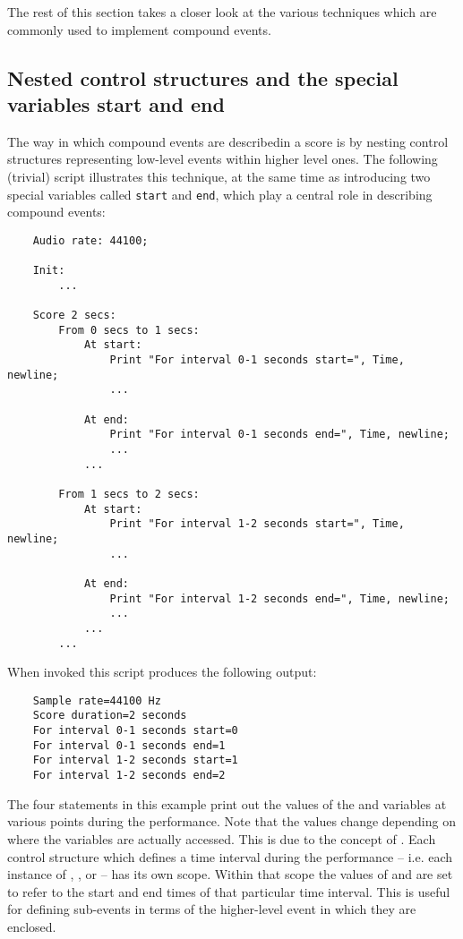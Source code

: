 The rest of this section takes a closer look at the various techniques
which are commonly used to implement compound events. 

\subsection{Nested control structures and the special variables start and end}
The way in which compound events are describedin a score is by nesting
control structures representing low-level events within higher level ones.
The following (trivial) script illustrates this technique, at the same time as
introducing two special variables called \verb|start| and \verb|end|, which
play a central role in describing compound events:

\begin{verbatim}
    Audio rate: 44100;
    
    Init:
        ...
    
    Score 2 secs:
        From 0 secs to 1 secs:
            At start:
                Print "For interval 0-1 seconds start=", Time, newline;
                ...
    
            At end:
                Print "For interval 0-1 seconds end=", Time, newline;
                ...
            ...
    
        From 1 secs to 2 secs:
            At start:
                Print "For interval 1-2 seconds start=", Time, newline;
                ...
    
            At end:
                Print "For interval 1-2 seconds end=", Time, newline;
                ...
            ...
        ...
\end{verbatim}

When invoked this script produces the following output:

\begin{verbatim}
    Sample rate=44100 Hz
    Score duration=2 seconds
    For interval 0-1 seconds start=0
    For interval 0-1 seconds end=1
    For interval 1-2 seconds start=1
    For interval 1-2 seconds end=2
\end{verbatim}

The four  statements in this example print out the values of
the  and  variables at various points during the
performance. Note that the values change depending on where the variables
are actually accessed. This is due to the concept of . Each
control structure which defines a time interval during the performance
-- i.e. each instance of , , 
or  -- has its own scope. Within that scope the values of
 and  are set to refer to the start and end times
of that particular time interval. This is useful for defining sub-events
in terms of the higher-level event in which they are enclosed.

